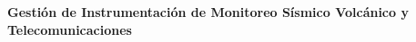 
\thispagestyle{allpages}

\vspace*{3cm}

\noindent
\begin{minipage}{\textwidth} %
    \raggedleft %
    
    \fontsize{24}{26}\selectfont 
    \textbf{\documenttitle} %
    
    \vspace{2cm}
    
    \textbf{Gestión de Instrumentación de Monitoreo Sísmico Volcánico y Telecomunicaciones} 
    
\end{minipage} %
